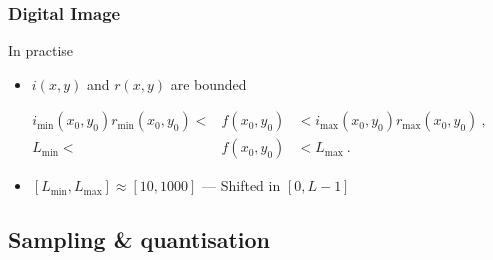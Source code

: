 \documentclass[table]{beamer}
\begin{document}
\begin{frame}
  \frametitle{Digital Image}
    \begin{block}{In practise}
      \begin{itemize}\scriptsize
      \item $i(x,y)$ and $r(x,y)$ are bounded
      \end{itemize}
      {\scriptsize
      \begin{eqnarray}
        i_{\text{min}}(x_0, y_0) r_{\text{min}}(x_0, y_0) < & f(x_0, y_0) & < i_{\text{max}}(x_0, y_0) r_{\text{max}}(x_0, y_0) \ , \\
        L_\text{min} < & f(x_0, y_0) & < L_\text{max} \ .
      \end{eqnarray}}
    \begin{itemize}
      \item $[L_\text{min}, L_\text{max}] \approx [10, 1000]$ --- Shifted in $[0, L-1]$
    \end{itemize}
    \end{block}
\end{frame}

\subsection{Sampling \& quantisation}
\end{document}
